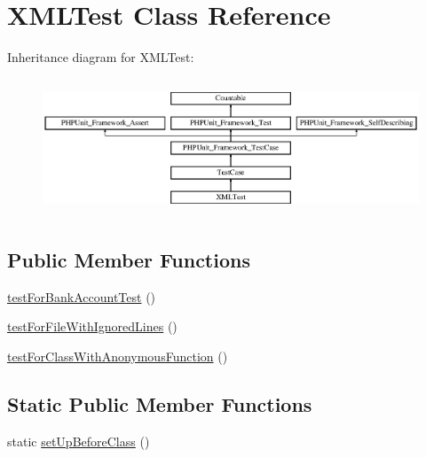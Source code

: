 \hypertarget{class_sebastian_bergmann_1_1_code_coverage_1_1_report_1_1_xml_1_1_x_m_l_test}{}\section{X\+M\+L\+Test Class Reference}
\label{class_sebastian_bergmann_1_1_code_coverage_1_1_report_1_1_xml_1_1_x_m_l_test}
Inheritance diagram for X\+M\+L\+Test\+:\begin{figure}[H]
\begin{center}
\leavevmode
\includegraphics[height=4.129793cm]{class_sebastian_bergmann_1_1_code_coverage_1_1_report_1_1_xml_1_1_x_m_l_test}
\end{center}
\end{figure}
\subsection*{Public Member Functions}
\begin{DoxyCompactItemize}
\item 
\mbox{\hyperlink{class_sebastian_bergmann_1_1_code_coverage_1_1_report_1_1_xml_1_1_x_m_l_test_ad9fed07aad4f99ced47846343159b5f9}{test\+For\+Bank\+Account\+Test}} ()
\item 
\mbox{\hyperlink{class_sebastian_bergmann_1_1_code_coverage_1_1_report_1_1_xml_1_1_x_m_l_test_a56dd0d19a0cf97658af874006a48fcf5}{test\+For\+File\+With\+Ignored\+Lines}} ()
\item 
\mbox{\hyperlink{class_sebastian_bergmann_1_1_code_coverage_1_1_report_1_1_xml_1_1_x_m_l_test_a1f10d167be4113a4aa37e6c1633e4d01}{test\+For\+Class\+With\+Anonymous\+Function}} ()
\end{DoxyCompactItemize}
\subsection*{Static Public Member Functions}
\begin{DoxyCompactItemize}
\item 
static \mbox{\hyperlink{class_sebastian_bergmann_1_1_code_coverage_1_1_report_1_1_xml_1_1_x_m_l_test_a80ef9eb20e7443b38276fb4647985fb7}{set\+Up\+Before\+Class}} ()
\end{DoxyCompactItemize}
